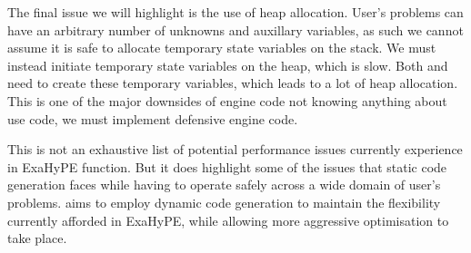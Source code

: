 The final issue we will highlight is the use of heap allocation.
User's problems can have an arbitrary number of unknowns and auxillary variables, 
as such we cannot assume it is safe to allocate temporary state variables on the stack.
We must instead initiate temporary state variables on the heap, which is slow.
Both  and  need to create these temporary variables, which leads to a lot of heap allocation.
This is one of the major downsides of engine code not knowing anything about use code, we must implement defensive engine code.


This is not an exhaustive list of potential performance issues currently experience in ExaHyPE  function.
But it does highlight some of the issues that static code generation faces while having to operate safely across a wide domain of user's problems.
\phlat aims to employ dynamic code generation to maintain the flexibility currently afforded in ExaHyPE, while allowing more aggressive optimisation to take place.
